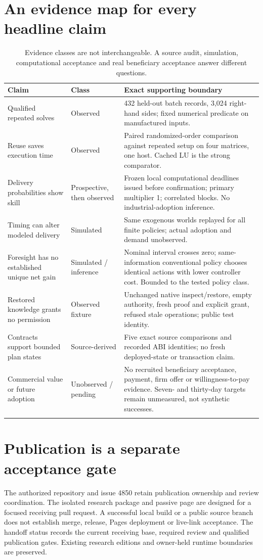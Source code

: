 \documentclass[11pt,a4paper]{article}
\begin{document}
\section{An evidence map for every headline claim}
\begin{longtable}{@{}L{37mm}L{24mm}L{94mm}@{}}
\toprule Claim & Class & Exact supporting boundary\\\midrule\endhead
Qualified repeated solves & Observed & 432 held-out batch records, 3,024 right-hand sides; fixed numerical predicate on manufactured inputs.\\
Reuse saves execution time & Observed & Paired randomized-order comparison against repeated setup on four matrices, one host. Cached LU is the strong comparator.\\
Delivery probabilities show skill & Prospective, then observed & Frozen local computational deadlines issued before confirmation; primary multiplier 1; correlated blocks. No industrial-adoption inference.\\
Timing can alter modeled delivery & Simulated & Same exogenous worlds replayed for all finite policies; actual adoption and demand unobserved.\\
Foresight has no established unique net gain & Simulated / inference & Nominal interval crosses zero; same-information conventional policy chooses identical actions with lower controller cost. Bounded to the tested policy class.\\
Restored knowledge grants no permission & Observed fixture & Unchanged native inspect/restore, empty authority, fresh proof and explicit grant, refused stale operations; public test identity.\\
Contracts support bounded plan states & Source-derived & Five exact source comparisons and recorded ABI identities; no fresh deployed-state or transaction claim.\\
Commercial value or future adoption & Unobserved / pending & No recruited beneficiary acceptance, payment, firm offer or willingness-to-pay evidence. Seven- and thirty-day targets remain unmeasured, not synthetic successes.\\
\bottomrule
\caption{Evidence classes are not interchangeable. A source audit, simulation, computational acceptance and real beneficiary acceptance answer different questions.}
\end{longtable}

\section{Publication is a separate acceptance gate}
The authorized repository and issue 4850 retain publication ownership and review coordination. The isolated research package and passive page are designed for a focused receiving pull request. A successful local build or a public source branch does not establish merge, release, Pages deployment or live-link acceptance. The handoff status records the current receiving base, required review and qualified publication gates. Existing research editions and owner-held runtime boundaries are preserved.
\end{document}
